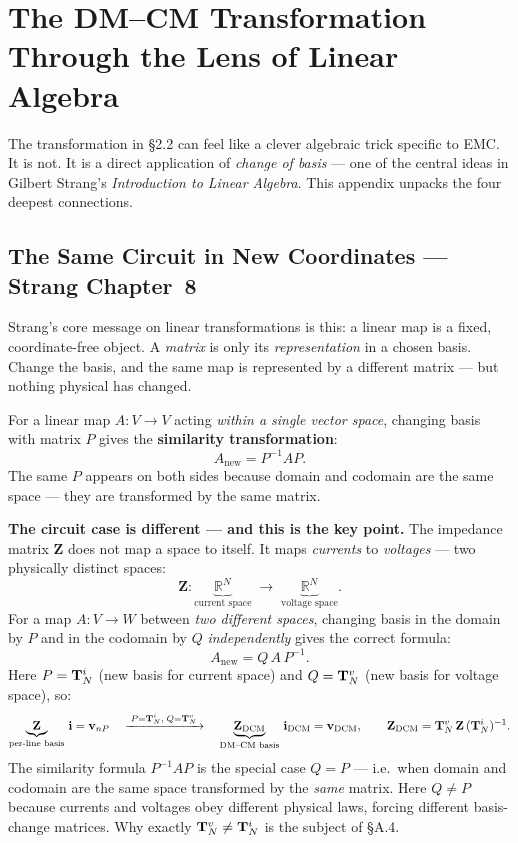 

\section{The DM--CM Transformation Through the Lens of Linear Algebra}
\label{app:linalg}

The transformation in \S2.2 can feel like a clever algebraic trick
specific to EMC.  It is not.  It is a direct application of
\emph{change of basis} — one of the central ideas in Gilbert Strang's
\textit{Introduction to Linear Algebra}.  This appendix unpacks the
four deepest connections.

\subsection{The Same Circuit in New Coordinates — Strang Chapter~8}

Strang's core message on linear transformations is this: a linear map
is a fixed, coordinate-free object.  A \emph{matrix} is only its
\emph{representation} in a chosen basis.  Change the basis, and the
same map is represented by a different matrix — but nothing physical
has changed.

For a linear map $A \colon V \to V$ acting \emph{within a single
vector space}, changing basis with matrix $P$ gives the
\textbf{similarity transformation}:
\[
    A_{\mathrm{new}} = P^{-1} A P.
\]
The same $P$ appears on both sides because domain and codomain are
the same space — they are transformed by the same matrix.

\textbf{The circuit case is different — and this is the key point.}
The impedance matrix $\mathbf{Z}$ does not map a space to itself.
It maps \emph{currents} to \emph{voltages} — two physically distinct
spaces:
\[
    \mathbf{Z}
    \colon \underbrace{\mathbb{R}^N}_{\text{current space}}
    \;\longrightarrow\;
    \underbrace{\mathbb{R}^N}_{\text{voltage space}}.
\]
For a map $A \colon V \to W$ between \emph{two different spaces},
changing basis in the domain by $P$ and in the codomain by $Q$
\emph{independently} gives the correct formula:
\[
    \boxed{A_{\mathrm{new}} = Q\,A\,P^{-1}.}
\]
Here $P = \mathbf{T}^{i}_{N}$ (new basis for current space) and
$Q = \mathbf{T}^{v}_{N}$ (new basis for voltage space), so:
\[
    \underbrace{\mathbf{Z}}_{\text{per-line basis}}\,\mathbf{i}
    = \mathbf{v}_{nP}
    \quad\xrightarrow{\;P=\mathbf{T}^{i}_{N},\;Q=\mathbf{T}^{v}_{N}\;}\quad
    \underbrace{\mathbf{Z}_{\mathrm{DCM}}}_{\text{DM--CM basis}}\,\mathbf{i}_{\mathrm{DCM}}
    = \mathbf{v}_{\mathrm{DCM}},
    \qquad
    \mathbf{Z}_{\mathrm{DCM}} = \mathbf{T}^{v}_{N}\,\mathbf{Z}\,(\mathbf{T}^{i}_{N})^{-1}.
\]
The similarity formula $P^{-1}AP$ is the special case $Q = P$ —
i.e.\ when domain and codomain are the same space transformed by the
\emph{same} matrix.  Here $Q \neq P$ because currents and voltages
obey different physical laws, forcing different basis-change matrices.
Why exactly $\mathbf{T}^{v}_{N} \neq \mathbf{T}^{i}_{N}$ is the subject of \S A.4.

